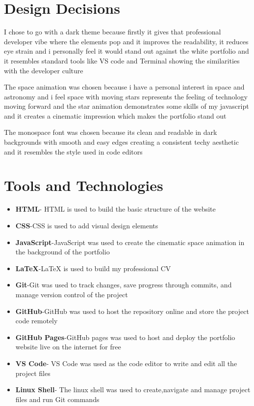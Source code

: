 \documentclass{article}
\begin{document}
\section{Design Decisions}
I chose to go with a dark theme because firstly it gives that professional developer vibe where the elements pop and it improves the readability, it reduces eye strain and i personally feel it would stand out against the white portfolio and it resembles standard tools like VS code and Terminal showing the similarities with the developer culture 

The space animation was chosen because i have a personal interest in space and astronomy and i feel space with moving stars represents the feeling of technology moving forward and the star animation demonstrates some skills of my javascript and it creates a cinematic impression which makes the portfolio stand out 

The monospace font was chosen because its clean and readable in dark backgrounds with smooth and easy edges creating a consistent techy aesthetic and it resembles the style used in code editors
\newpage
\section{Tools and Technologies}
\begin{itemize}
    \item \textbf{HTML}- HTML is used to build the basic structure of the website 
    \item \textbf{CSS}-CSS is used to add visual design  elements 
    \item \textbf{JavaScript}-JavaScript was used to create the cinematic space animation in the background of the portfolio 
    \item \textbf{LaTeX}-LaTeX is used to build my professional CV 
    \item \textbf{Git}-Git was used to track changes, save progress through commits, and manage version control of the project 
    \item \textbf{GitHub}-GitHub was used to host the repository online and store the project code remotely
    \item \textbf{GitHub Pages}-GitHub pages was used to host and deploy the portfolio website live on the internet for free
    \item \textbf{VS Code}- VS Code was used as the code editor to write and edit all the project files 
    \item \textbf{Linux Shell}- The linux shell was used to create,navigate and manage project files and run Git commands
\end{itemize}
\end{document}
